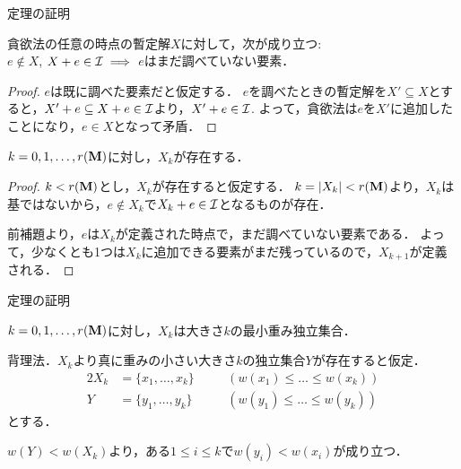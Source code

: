 \documentclass[14pt,aspectratio=169,xcolor=dvipsnames,table,onlytextwidth,dvipdfmx]{beamer}
\begin{document}
\begin{frame}{定理の証明}
    \small
    \begin{lemma}
        貪欲法の任意の時点の暫定解$X$に対して，次が成り立つ:\\
        $e \notin X$, $X + e \in \mathcal{I} \implies$ $e$はまだ調べていない要素．
    \end{lemma}
    \pause
    \begin{proof}
    $e$は既に調べた要素だと仮定する．
    $e$を調べたときの暫定解を$X' \subseteq X$とすると，$X' + e \subseteq X + e \in \mathcal{I}$より，$X' + e \in \mathcal{I}$.
    よって，貪欲法は$e$を$X'$に追加したことになり，$e \in X$となって矛盾．
    \end{proof}

    \vfill
    \pause
    \begin{lemma}
        $k = 0, 1, \dots, r(\mathbf{M})$に対し，$X_k$が存在する．
    \end{lemma}
    \pause
    \begin{proof}
    $k < r(\mathbf{M})$とし，$X_k$が存在すると仮定する．
    $k = \lvert X_k\rvert < r(\mathbf{M})$より，$X_k$は基ではないから，$e \notin X_k$で$X_k + e \in \mathcal{I}$となるものが存在．

    \pause
    前補題より，$e$は$X_k$が定義された時点で，まだ調べていない要素である．
    よって，少なくとも1つは$X_k$に追加できる要素がまだ残っているので，$X_{k+1}$が定義される． 
    \end{proof}
\end{frame}

\begin{frame}{定理の証明}
    \small
    \begin{lemma}
        $k = 0, 1, \dots, r(\mathbf{M})$に対し，$X_k$は大きさ$k$の最小重み独立集合．
    \end{lemma}

    \pause
    背理法．$X_k$より真に重みの小さい大きさ$k$の独立集合$Y$が存在すると仮定．
    \begin{alignat*}{2}
    X_k &= \{x_1, \dots, x_k\} &\quad& (w(x_1) \leq \dots \leq w(x_k)) \\
    Y   &= \{y_1, \dots, y_k\} &\quad& (w(y_1) \leq \dots \leq w(y_k)) 
    \end{alignat*}
    とする．

    \bigskip
    $w(Y) < w(X_k)$より，ある$1 \leq i \leq k$で$w(y_i) < w(x_i)$が成り立つ．
    
    \begin{center}
    \end{center}
\end{frame}
\end{document}
